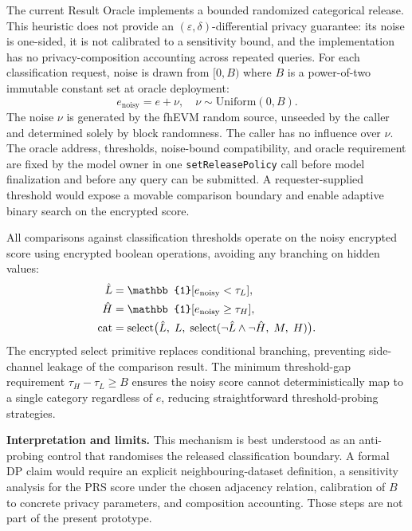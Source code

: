 \documentclass[10pt,twocolumn]{article}
\begin{document}
The current Result Oracle implements a bounded randomized categorical release.
This heuristic does not provide an $(\varepsilon,\delta)$-differential privacy
guarantee: its noise is one-sided, it is not calibrated to a sensitivity bound, and
the implementation has no privacy-composition accounting across repeated queries.
For each classification request, noise is drawn from $[0, B)$ where $B$ is a
power-of-two immutable constant set at oracle deployment:
\begin{equation}
e_{\mathrm{noisy}} = e + \nu, \quad \nu \sim \mathrm{Uniform}(0, B).
\end{equation}
The noise $\nu$ is generated by the fhEVM random source, unseeded by the caller
and determined solely by block randomness.  The caller has no influence over $\nu$.
The oracle address, thresholds, noise-bound compatibility, and oracle requirement are
fixed by the model owner in one \texttt{setReleasePolicy} call before model finalization
and before any query can be submitted.  A requester-supplied threshold would expose a
movable comparison boundary and enable adaptive binary search on the encrypted score.

All comparisons against classification thresholds operate on the noisy encrypted
score using encrypted boolean operations, avoiding any branching on hidden values:
\begin{align}
\hat{L} &= \mathbb{1}[e_{\mathrm{noisy}} < \tau_L], \notag\\
\hat{H} &= \mathbb{1}[e_{\mathrm{noisy}} \geq \tau_H], \notag\\
\mathrm{cat} &= \mathrm{select}\bigl(\hat{L},\;L,\;\mathrm{select}(\neg\hat{L}\wedge\neg\hat{H},\;M,\;H)\bigr).
\label{eq:classify}
\end{align}
The encrypted select primitive replaces conditional branching,
preventing side-channel leakage of the comparison result.  The minimum threshold-gap
requirement $\tau_H - \tau_L \geq B$ ensures the noisy score cannot deterministically
map to a single category regardless of $e$, reducing straightforward threshold-probing
strategies.

\textbf{Interpretation and limits.}
This mechanism is best understood as an anti-probing control that randomises the
released classification boundary.  A formal DP claim would require an explicit
neighbouring-dataset definition, a sensitivity analysis for the PRS score under the
chosen adjacency relation, calibration of $B$ to concrete privacy parameters, and
composition accounting.  Those steps are not part of the present prototype.
\end{document}
